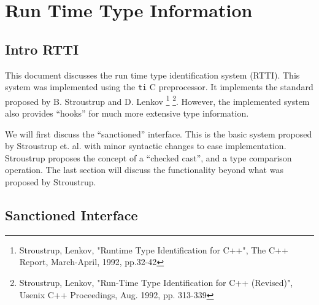 \chapter{Run Time Type Information}
\begin{htmlonly}
\end{htmlonly}

\section{Intro RTTI}

This document discusses the run time type identification system (RTTI). This 
system was implemented using the {\tt ti} C preprocessor. It 
implements the standard proposed by B. Stroustrup and D. Lenkov 
\footnote{Stroustrup, Lenkov, "Runtime Type Identification for C++", The C++ 
Report, March-April, 1992, pp.32-42} \footnote{Stroustrup, Lenkov, "Run-Time 
Type Identification for C++ (Revised)", Usenix C++ Proceedings, Aug. 1992, 
pp. 313-339}. However, the implemented system also provides ``hooks'' for much 
more extensive type information.

We will first discuss the ``sanctioned'' interface. This is the basic system
proposed by Stroustrup et. al. with minor syntactic changes to ease 
implementation. Stroustrup proposes the concept of a ``checked cast'', and
a type comparison operation. The last section will discuss the functionality
beyond what was proposed by Stroustrup.

\section{Sanctioned Interface}


